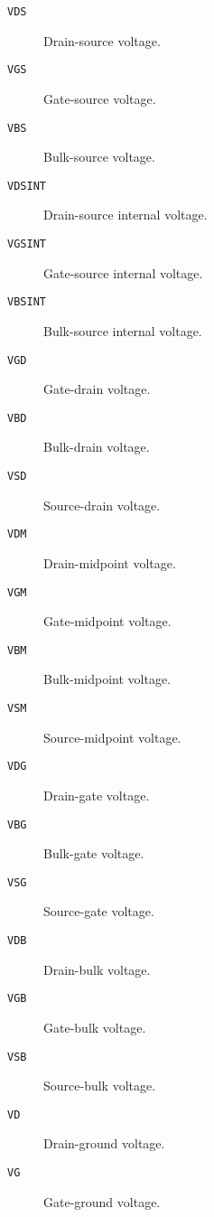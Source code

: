 \begin{description}

\item[{\tt VDS}] Drain-source voltage.

\item[{\tt VGS}] Gate-source voltage.

\item[{\tt VBS}] Bulk-source voltage.

\item[{\tt VDSINT}] Drain-source internal voltage.

\item[{\tt VGSINT}] Gate-source internal voltage.

\item[{\tt VBSINT}] Bulk-source internal voltage.

\item[{\tt VGD}] Gate-drain voltage.

\item[{\tt VBD}] Bulk-drain voltage.

\item[{\tt VSD}] Source-drain voltage.

\item[{\tt VDM}] Drain-midpoint voltage.

\item[{\tt VGM}] Gate-midpoint voltage.

\item[{\tt VBM}] Bulk-midpoint voltage.

\item[{\tt VSM}] Source-midpoint voltage.

\item[{\tt VDG}] Drain-gate voltage.

\item[{\tt VBG}] Bulk-gate voltage.

\item[{\tt VSG}] Source-gate voltage.

\item[{\tt VDB}] Drain-bulk voltage.

\item[{\tt VGB}] Gate-bulk voltage.

\item[{\tt VSB}] Source-bulk voltage.

\item[{\tt VD}] Drain-ground voltage.

\item[{\tt VG}] Gate-ground voltage.


\end{description}
